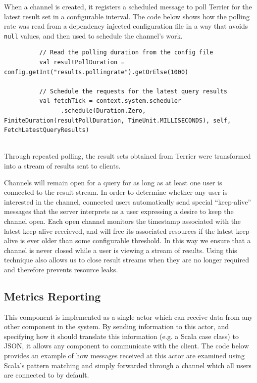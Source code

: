 \documentclass{l4proj}
\newcommand{\code}[1]{\texttt{#1}}
\begin{document}
        When a channel is created, it registers a scheduled message to poll Terrier for the latest result set in a configurable interval. The code below shows how the polling rate was read from a dependency injected configuration file in a way that avoids \code{null} values, and then used to schedule the channel's work.
        
        \begin{lstlisting}
          // Read the polling duration from the config file  
          val resultPollDuration = config.getInt("results.pollingrate").getOrElse(1000)
          
          // Schedule the requests for the latest query results
          val fetchTick = context.system.scheduler
                .schedule(Duration.Zero, FiniteDuration(resultPollDuration, TimeUnit.MILLISECONDS), self, FetchLatestQueryResults)
           
        \end{lstlisting}

        Through repeated polling, the result sets obtained from Terrier were transformed into a stream of results sent to clients.
        
        Channels will remain open for a query for as long as at least one user is connected to the result stream. In order to determine whether any user is interested in the channel, connected users automatically send special ``keep-alive'' messages that the server interprets as a user expressing a desire to keep the channel open. Each open channel monitors the timestamp associated with the latest keep-alive receieved, and will free its associated resources if the latest keep-alive is ever older than some configurable threshold. In this way we ensure that a channel is never closed while a user is viewing a stream of results. Using this technique also allows us to close result streams when they are no longer required and therefore prevents resource leaks.
        
    \subsection{Metrics Reporting}
    This component is implemented as a single actor which can receive data from any other component in the system. By sending information to this actor, and specifying how it should translate this information (e.g. a Scala case class) to JSON, it allows any component to communicate with the client. The code below provides an example of how messages received at this actor are examined using Scala's pattern matching and simply forwarded through a channel which all users are connected to by default.
    
\end{document}
